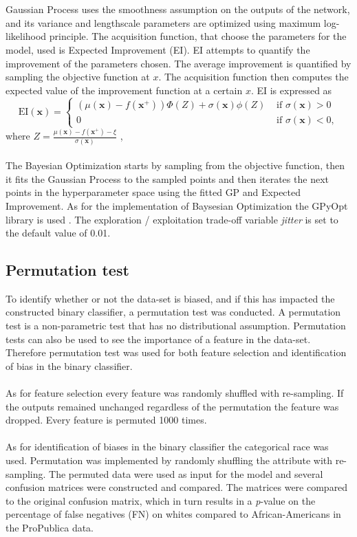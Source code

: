 \documentclass[11pt, fleqn, titlepage]{article}
\begin{document}
	\\\\
	Gaussian Process uses the smoothness assumption on the outputs of the network, and its variance and lengthscale parameters are optimized using maximum log-likelihood principle. \cite{aktiv_gp} The acquisition function, that choose the parameters for the model, used is Expected Improvement (EI). EI attempts to quantify the improvement of the parameters chosen. The average improvement is quantified by sampling the objective function at $x$. The acquisition function then computes the expected value of the improvement function at a certain $x$. EI is expressed as 
	\begin{equation*}
	\mathrm{EI}(\mathbf{x})=\left\{\begin{array}{ll}
	\left(\mu(\mathbf{x})-f\left(\mathbf{x}^{+}\right)\right) \Phi(Z)+\sigma(\mathbf{x}) \phi(Z) & \text { if } \sigma(\mathbf{x})>0 \\
	0 & \text { if } \sigma(\mathbf{x})<0,
	\end{array}\right. 
	\end{equation*}
	where $ Z = \frac{\mu(\mathbf{x}) - f(\mathbf{x}^+) - \xi }{\sigma(\mathbf{x})}$ , \cite{aktiv_bo} 
	\\\\
	The Bayesian Optimization starts by sampling from the objective function, then it fits the Gaussian Process to the sampled points and then iterates the next points in the hyperparameter space using the fitted GP and Expected Improvement. As for the implementation of Baysesian Optimization the GPyOpt library is used \cite{bo_lib}. The exploration / exploitation trade-off variable \textit{jitter} is set to the default value of 0.01.
	
	\subsection{Permutation test}
	To identify whether or not the data-set is biased, and if this has impacted the constructed binary classifier, a permutation test was conducted. A permutation test is a non-parametric test that has no distributional assumption. Permutation tests can also be used to see the importance of a feature in the data-set. Therefore permutation test was used for both feature selection and identification of bias in the binary classifier. \\\\
	As for feature selection every feature was randomly shuffled with re-sampling. If the outputs remained unchanged regardless of the permutation the feature was dropped. Every feature is permuted 1000 times.\\\\
	As for identification of biases in the binary classifier the categorical race was used. Permutation was implemented by randomly shuffling the attribute with re-sampling. The permuted data were used as input for the model and several confusion matrices were constructed and compared. The matrices were compared to the original confusion matrix, which in turn results in a \textit{p}-value on the percentage of false negatives (FN) on whites compared to African-Americans in the ProPublica data.
	
\end{document}
